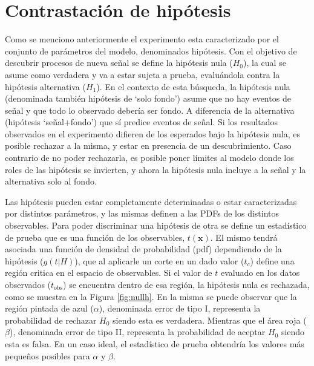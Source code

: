 \section{Contrastación de hipótesis}

Como se menciono anteriormente el experimento esta caracterizado por el conjunto de parámetros del modelo, denominados hipótesis. Con el objetivo de descubrir procesos de nueva señal se define la hipótesis nula ($H_0$), la cual se asume como verdadera y va a estar sujeta a prueba, evaluándola contra la hipótesis alternativa ($H_1$). En el contexto de esta búsqueda, la hipótesis nula (denominada también hipótesis de `solo fondo') asume que no hay eventos de señal y que todo lo observado debería ser fondo. A diferencia de la alternativa (hipótesis `señal+fondo') que sí predice eventos de señal. Si los resultados observados en el experimento difieren de los esperados bajo la hipótesis nula, es posible rechazar a la misma, y estar en presencia de un descubrimiento. Caso contrario de no poder rechazarla, es posible poner límites al modelo donde los roles de las hipótesis se invierten, y ahora la hipótesis nula incluye a la señal y la alternativa solo al fondo.

Las hipótesis pueden estar completamente determinadas o estar caracterizadas por distintos parámetros, y las mismas definen a las PDFs de los distintos observables. Para poder discriminar una hipótesis de otra se define un estadístico de prueba que es una función de los observables, $t(\textbf{x})$. El mismo tendrá asociada una función de densidad de probabilidad (pdf) dependiendo de la hipótesis ($g(t|H)$), que al aplicarle un corte en un dado valor ($t_c$) define una región critica en el espacio de observables. Si el valor de $t$ evaluado en los datos observados ($t_{\text{obs}}$) se encuentra dentro de esa región, la hipótesis nula es rechazada, como se muestra en la Figura \ref{fig:nullh}. En la misma se puede observar que la región pintada de azul ($\alpha$), denominada error de tipo I, representa la probabilidad de rechazar $H_0$ siendo esta es verdadera. Mientras que el área roja ($\beta$), denominada error de tipo II, representa la probabilidad de aceptar $H_0$ siendo esta es falsa. En un caso ideal, el estadístico de prueba obtendría los valores más pequeños posibles para $\alpha$ y $\beta$.

